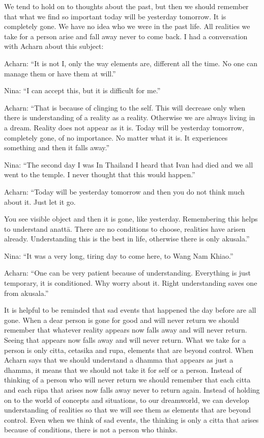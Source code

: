 We tend to hold on to thoughts about the past, but then we should
remember that what we find so important today will be yesterday
tomorrow. It is completely gone. We have no idea who we were in the past
life. All realities we take for a person arise and fall away never to
come back. I had a conversation with Acharn about this subject:

Acharn: ``It is not I, only the way elements are, different all the
time. No one can manage them or have them at will.''

Nina: ``I can accept this, but it is difficult for me.''

Acharn: ``That is because of clinging to the self. This will decrease
only when there is understanding of a reality as a reality. Otherwise we
are always living in a dream. Reality does not appear as it is. Today
will be yesterday tomorrow, completely gone, of no importance. No matter
what it is. It experiences something and then it falls away.''

Nina: ``The second day I was In Thailand I heard that Ivan had died and
we all went to the temple. I never thought that this would happen.''

Acharn: ``Today will be yesterday tomorrow and then you do not think
much about it. Just let it go.

You see visible object and then it is gone, like yesterday. Remembering
this helps to understand anattā. There are no conditions to choose,
realities have arisen already. Understanding this is the best in life,
otherwise there is only akusala.''

Nina: ``It was a very long, tiring day to come here, to Wang Nam
Khiao.''

Acharn: ``One can be very patient because of understanding. Everything
is just temporary, it is conditioned. Why worry about it. Right
understanding saves one from akusala.''

It is helpful to be reminded that sad events that happened the day
before are all gone. When a dear person is gone for good and will never
return we should remember that whatever reality appears now falls away
and will never return. Seeing that appears now falls away and will never
return. What we take for a person is only citta, cetasika and rupa,
elements that are beyond control. When Acharn says that we should
understand a dhamma that appears as just a dhamma, it means that we
should not take it for self or a person. Instead of thinking of a person
who will never return we should remember that each citta and each rūpa
that arises now falls away never to return again. Instead of holding on
to the world of concepts and situations, to our dreamworld, we can
develop understanding of realities so that we will see them as elements
that are beyond control. Even when we think of sad events, the thinking
is only a citta that arises because of conditions, there is not a person
who thinks.




